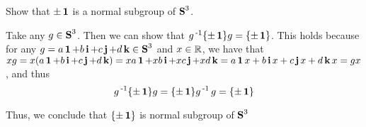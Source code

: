 \documentclass[11pt,onecolumn]{article}
\begin{document}
\begin{exercise}
 Show that ${\pm \one}$ is a normal subgroup of $\s^3$.
\end{exercise}
\begin{answer}
Take any $g \in \s^3$. Then we can show that $g\inv \{\pm \one \} g = \{\pm \one\}$. This holds because for any $g = a\one + b \ii + c\jj + d\kk \in \s^3$ and $x \in \real$, we have that $xg = x(a\one + b \ii + c\jj + d\kk) = xa\one + xb \ii + xc\jj + xd\kk = a\one x + b \ii x + c\jj x + d\kk x =  gx$, and thus $$g\inv\{\pm \one\} g = \{\pm \one \} g\inv g = \{\pm \one \}$$

Thus, we conclude that $\{ \pm \one\} $ is normal subgroup of $\s^3$

\end{answer}
\end{document}
